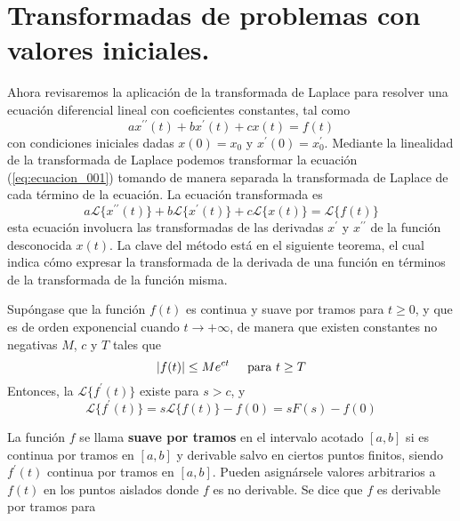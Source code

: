 \section{Transformadas de problemas con valores iniciales.}
Ahora revisaremos la aplicación de la transformada de Laplace para resolver una ecuación diferencial lineal con coeficientes constantes, tal como 
\begin{equation}
a x^{\prime \prime} (t) + b x^{\prime} (t) + c x(t) = f(t)
\label{eq:ecuacion_001}
\end{equation}
con condiciones iniciales dadas $x(0) = x_{0}$ y $x^{\prime}(0) = x^{\prime}_{0}$. Mediante la linealidad de la
transformada de Laplace podemos transformar la ecuación (\ref{eq:ecuacion_001}) tomando de manera separada la transformada de Laplace de cada término de la ecuación. La ecuación transformada es
\begin{equation}
a \mathscr{L} \{ x^{\prime \prime} (t) \} + b \mathscr{L} \{ x^{\prime} (t) \} + c \mathscr{L} \{ x (t) \} = \mathscr{L} \{ f(t) \}
\label{eq:ecuacion_002}
\end{equation}
esta ecuación involucra las transformadas de las derivadas $x^{\prime}$ y $x^{\prime \prime}$ de la función desconocida
$x(t)$. La clave del método está en el siguiente teorema, el cual indica cómo expresar la transformada de la derivada de una función en términos de la transformada de la función misma.
\begin{teo}
\label{teo_001}
Supóngase que la función $f(t)$ es continua y suave por tramos para $t \geq 0$, y que es de orden exponencial cuando $t \to + \infty$, de manera que existen constantes no negativas $M$, $c$ y $T$ tales que
\begin{equation}
\vert f(t) \vert \leq M e^{ct} \hspace{0.5cm} \mbox{para } t \geq T
\label{eq:ecuacion_003}
\end{equation}
Entonces, la $\mathscr{L} \{ f^{\prime} (t) \}$ existe para $s > c$, y
\begin{equation}
\mathscr{L} \{ f^{\prime} (t) \} = s \mathscr{L} \{ f(t) \} - f(0) = s F(s) - f(0)
\label{eq:ecuacion_004}
\end{equation}
\end{teo}
La función $f$ se llama \textbf{suave por tramos} en el intervalo acotado $[a, b]$ si es continua por tramos en $[a, b]$ y derivable salvo en ciertos puntos finitos, siendo $f^{\prime}(t)$ continua por tramos en $[a, b]$. Pueden asignársele valores arbitrarios a $f(t)$ en los puntos aislados donde $f$ es no derivable. Se dice que $f$ es derivable por tramos para
